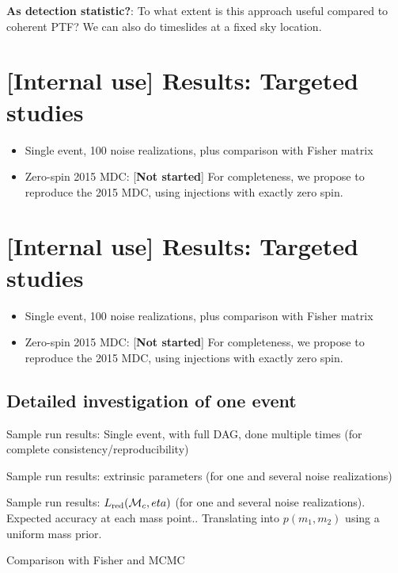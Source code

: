 \noindent \textbf{As detection statistic?}: To what extent is this approach useful compared to coherent PTF?  We can
also do timeslides at a fixed sky location.


\section{[Internal use] Results: Targeted studies}

\begin{itemize}
\item Single event, 100 noise realizations, plus comparison with Fisher matrix

\item Zero-spin 2015 MDC: [\textbf{Not started}]  For completeness, we propose to reproduce the 2015 MDC,  using
  injections with exactly zero spin.

\end{itemize}

\section{[Internal use] Results: Targeted studies}

\begin{itemize}
\item Single event, 100 noise realizations, plus comparison with Fisher matrix

\item Zero-spin 2015 MDC: [\textbf{Not started}]  For completeness, we propose to reproduce the 2015 MDC,  using
  injections with exactly zero spin.

\end{itemize}

\subsection{Detailed investigation of one event}
Sample run results: Single event, with full DAG, done multiple times (for complete consistency/reproducibility)

Sample run results: extrinsic parameters (for one and several noise realizations)

Sample run results: $L_{\rm red}({{\cal M}_c},eta)$ (for one and several noise realizations). Expected accuracy at each mass
point.. Translating into  $p(m_1,m_2)$ using a uniform mass prior.

Comparison with Fisher and MCMC




